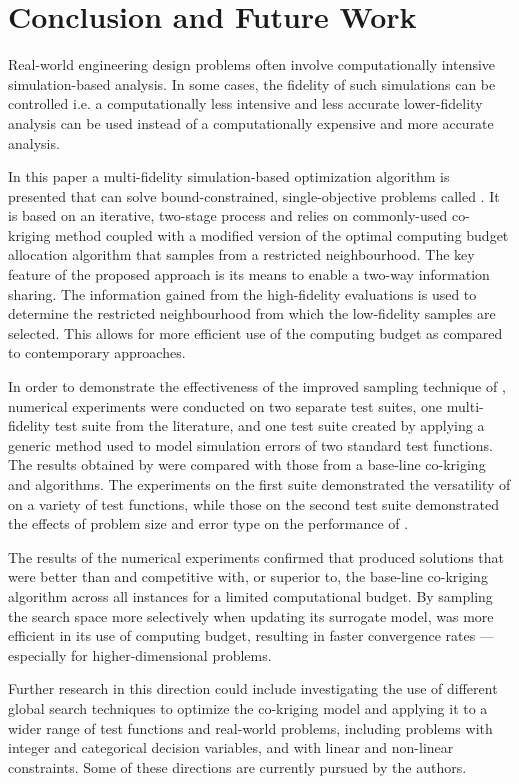 \section{Conclusion and Future Work}\label{sec:conc}
Real-world engineering design problems often involve computationally intensive simulation-based analysis. In some cases, the fidelity of such simulations can be controlled i.e. a computationally less intensive and less accurate lower-fidelity analysis can be used instead of a computationally expensive and more accurate analysis.

In this paper a multi-fidelity simulation-based optimization algorithm is presented that can solve bound-constrained, single-objective problems called \AlgName{}. It is based on an iterative, two-stage process and relies on commonly-used co-kriging method coupled with a modified version of the optimal computing budget allocation algorithm that samples from a restricted neighbourhood. The key feature of the proposed approach is its means to enable a two-way information sharing. The information gained from the high-fidelity evaluations is used to determine the restricted neighbourhood from which the low-fidelity samples are selected. This allows for more efficient use of the computing budget as compared to contemporary approaches.

In order to demonstrate the effectiveness of the improved sampling technique of \AlgName{}, numerical experiments were conducted on two separate test suites, one multi-fidelity test suite from the literature, and one test suite created by applying a generic method used to model simulation errors of two standard test functions. The results  obtained by \AlgName{} were compared with those from a base-line co-kriging and \motos{} algorithms.  The experiments on the first suite demonstrated the versatility of \AlgName{} on a variety of test functions, while those on the second test suite demonstrated the effects of problem size and error type on the performance of \AlgName{}.

The results of the numerical experiments confirmed that \AlgName{} produced solutions that were better than \motos{} and competitive with, or superior to, the base-line co-kriging algorithm across all instances for a limited computational budget. By sampling the search space more selectively when updating its surrogate model, \AlgName{} was more efficient in its use of computing budget, resulting in faster convergence rates --- especially for higher-dimensional problems.

Further research in this direction could include investigating the use of different global search techniques to optimize the co-kriging model and applying it to a wider range of test functions and real-world problems, including problems with integer and categorical decision variables, and with linear and non-linear constraints. Some of these directions are currently pursued by the authors.
